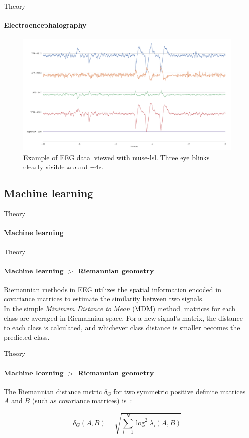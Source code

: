 \documentclass[xcolor={dvipsnames,table}]{beamer}
\newif\ifplacelogo{}  %
\begin{document}
\placelogofalse{}
\begin{frame}{Theory}
    \framesubtitle{Electroencephalography}
    \vspace*{-10mm}

    \begin{figure}
        \hspace*{-10mm}
        \includegraphics[width=\paperwidth]{img/muselsl-signal.png}
        \caption{Example of EEG data, viewed with muse-lsl. Three eye blinks clearly visible around $-4s$.}
    \end{figure}
\end{frame}
\placelogotrue{}

\subsection{Machine learning}
\begin{frame}{Theory}
    \framesubtitle{Machine learning}
\end{frame}

\begin{frame}{Theory}
    \framesubtitle{Machine learning $>$ Riemannian geometry}
    
    Riemannian methods in EEG utilizes the spatial information encoded in covariance matrices to estimate the similarity between two signals.
    \\
    \vspace{1em}
    In the simple \emph{Minimum Distance to Mean} (MDM) method, matrices for each class are averaged in Riemannian space. For a new signal's matrix, the distance to each class is calculated, and whichever class distance is smaller becomes the predicted class.
\end{frame}

\begin{frame}{Theory}
    \framesubtitle{Machine learning $>$ Riemannian geometry}
    
    \small The Riemannian distance metric $\delta_G$ for two symmetric positive definite matrices $A$ and $B$ (such as covariance matrices) is~\cite{grafarend_metric_2003}:

        \[ \delta_G(A, B) = \sqrt{\sum_{i=1}^N \log^2 \lambda_i (A, B) } \]
\end{frame}
\end{document}
